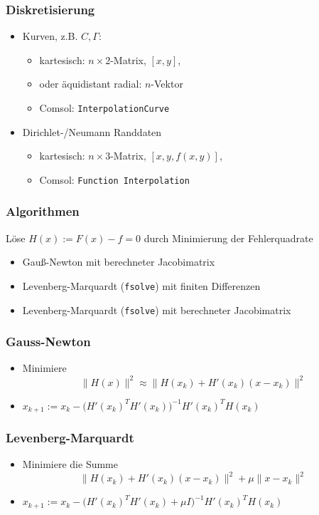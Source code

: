 \documentclass{beamer}
\begin{document}
\begin{frame}
	\frametitle{Diskretisierung}
	\begin{itemize}
		\item \pause
			Kurven, z.B. $C, \Gamma$:
			\begin{itemize}
				\item
					kartesisch: $n\times 2$-Matrix, $[x,y]$,
				\item
					oder äquidistant radial: $n$-Vektor
				\item
					Comsol: \texttt{InterpolationCurve}
			\end{itemize}
		\item \pause
			Dirichlet-/Neumann Randdaten
			\begin{itemize}
				\item
					kartesisch: $n\times 3$-Matrix, $[x,y,f(x,y)]$,
				\item
					Comsol: \texttt{Function Interpolation}
			\end{itemize}
	\end{itemize}
\end{frame}

\begin{frame}
	\frametitle{Algorithmen}
	Löse $H(x) := F(x) - f = 0$ durch Minimierung der Fehlerquadrate
	\begin{itemize}
		\item
			Gauß-Newton mit berechneter Jacobimatrix
		\item
			Levenberg-Marquardt (\texttt{fsolve}) mit finiten Differenzen
		\item
			Levenberg-Marquardt (\texttt{fsolve}) mit berechneter Jacobimatrix
	\end{itemize}
\end{frame}

\begin{frame}
	\frametitle{Gauss-Newton}
	\begin{itemize}
		\item
			Minimiere
			\[
				\|H(x)\|^2 \approx \|H(x_k) + H'(x_k)(x-x_k)\|^2
			\]
		\item
			$x_{k+1} := x_k - \Big(H'(x_k)^T H'(x_k)\Big)^{-1} H'(x_k)^T H(x_k)$
	\end{itemize}
\end{frame}

\begin{frame}
	\frametitle{Levenberg-Marquardt}
	\begin{itemize}
		\item
			Minimiere die Summe
			\[
				\|H(x_k) + H'(x_k)(x-x_k)\|^2 + \mu \|x-x_k\|^2
			\]
		\item
			$x_{k+1} := x_k - \Big(H'(x_k)^T H'(x_k) + \mu I \Big)^{-1} H'(x_k)^T H(x_k)$
	\end{itemize}
\end{frame}
\end{document}
